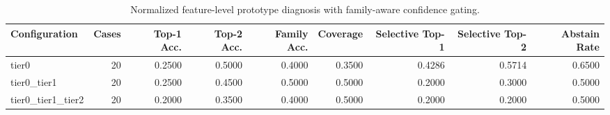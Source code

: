 \begin{table}[t]
\centering
\caption{Normalized feature-level prototype diagnosis with family-aware confidence gating.}
\label{tab:dice_stressor_hierarchical_diagnosis}
\footnotesize
\begin{tabular}{lrrrrrrrr}
\toprule
Configuration & Cases & Top-1 Acc. & Top-2 Acc. & Family Acc. & Coverage & Selective Top-1 & Selective Top-2 & Abstain Rate \\
\midrule
tier0 & 20 & 0.2500 & 0.5000 & 0.4000 & 0.3500 & 0.4286 & 0.5714 & 0.6500 \\
tier0_tier1 & 20 & 0.2500 & 0.4500 & 0.5000 & 0.5000 & 0.2000 & 0.3000 & 0.5000 \\
tier0_tier1_tier2 & 20 & 0.2000 & 0.3500 & 0.4000 & 0.5000 & 0.2000 & 0.2000 & 0.5000 \\
\bottomrule
\end{tabular}

\end{table}
